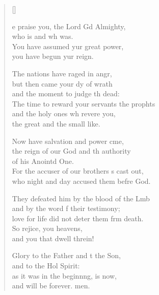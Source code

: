 \settowidth{\versewidth}{The time to reward your servants the prophets +}
\begin{verse}[\versewidth]
  \begin{patverse}
e praise you, the Lord Gd Almighty,\Med\\
who is and wh was.\\
You have assumed yur great power,\Med\\
you have begun yur reign.

The nations have raged in angr,\Flex\\
but then came your dy of wrath\Med\\
and the moment to judge th dead:\\
The time to reward your servants the prophts\Flex\\
and the holy ones wh revere you,\Med\\
the great and the small like.

Now have salvation and power cme,\Flex\\
the reign of our God and th authority\Med\\
of his Anointd One.\\
For the accuser of our brothers \pointup{\i}s cast out,\Med\\
who night and day accused them befre God.

They defeated him by the blood of the Lmb\Flex\\
and by the word f their testimony;\Med\\
love for life did not deter them frm death.\\
So rejice, you heavens,\Med\\
and you that dwell threin!

Glory to the Father and t the Son,\Med\\
and to the Hol Spirit:\\
as it was in the beginn\pointup{\i}ng, is now,\Med\\
and will be forever. men. 
  \end{patverse}
\end{verse}
